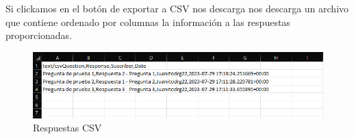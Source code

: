 Si clickamos en el botón de exportar a CSV nos descarga nos descarga un archivo que contiene ordenado por columnas la información a las respuestas proporcionadas. 

\begin{figure}[!ht]
    \centering
    \includegraphics[width=1\textwidth]{imagenes/respuestas_csv_a.png}
    \caption{ Respuestas CSV }
    \label{fig:creacion_contexto}
\end{figure}\vspace{0.5cm}